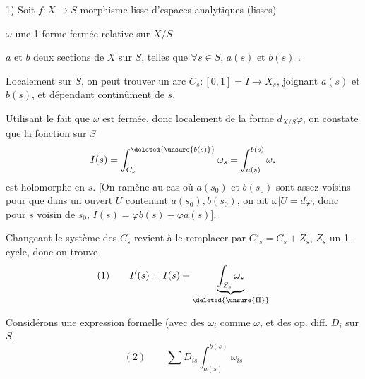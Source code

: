 1) Soit $f:X\longrightarrow S$ morphisme lisse d'espaces analytiques (lisses)

$\omega$ une 1-forme fermée  relative sur $X/S$

$a$ et $b$ deux sections  de $X$ sur $S$, telles que $\forall s\in S$, $a(s)$ et $b(s)$ .

Localement sur $S$, on peut trouver un arc   $C_s:[0,1]=I\longrightarrow X_s$, joignant $a(s)$ et $b(s)$, et dépendant continûment de $s$.

Utilisant le fait que $\omega$ est fermée, donc localement de la forme $d_{X/S}\varphi$, on constate que la fonction sur $S$
\[
I(s)=\int_{C_s}^{\deleted{\unsure{b(s)}}}\omega_s=\int_{a(s)}^{b(s)}\omega_s
\]
est holomorphe en $s$. [On  ramène au cas où  $a(s_0)$ et $b(s_0)$ sont assez voisins pour que dans un ouvert $U$ contenant $a(s_0),b(s_0)$, on ait $\omega|U=d\varphi$, donc pour $s$ voisin de $s_0$, $I(s)=\varphi b(s)-\varphi a(s)$].

Changeant le système des $C_s$ revient à le remplacer par $C'_s=C_s+Z_s$, $Z_s$ un 1-cycle, donc on trouve
\[
(1)\qquad I'(s)=I(s)+\underbrace{\int_{Z_s}\omega_s}_{\deleted{\unsure{\Pi}}}
\]

Considérons une expression formelle (avec des $\omega_i$ comme $\omega$, et des op. diff.  $D_i$ sur $S$]
\[
(2)\qquad \sum D_{is}\int_{a(s)}^{b(s)}\omega_{is}
\]
